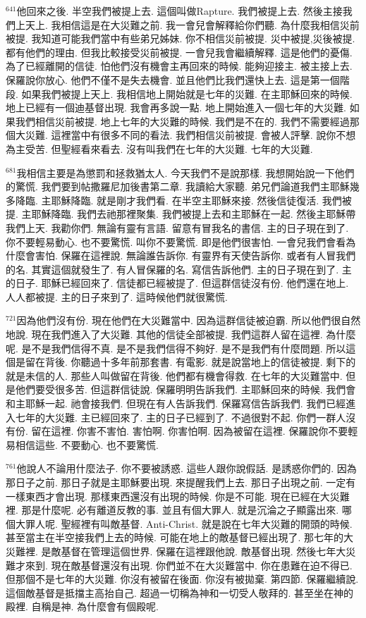 \documentclass{book}
\begin{document}
$^{641}$他回來之後.
半空我們被提上去.
這個叫做Rapture.
我們被提上去.
然後主接我們上天上.
我相信這是在大災難之前.
我一會兒會解釋給你們聽.
為什麼我相信災前被提.
我知道可能我們當中有些弟兄姊妹.
你不相信災前被提.
災中被提,災後被提.
都有他們的理由.
但我比較接受災前被提.
一會兒我會繼續解釋.
這是他們的憂傷.
為了已經離開的信徒.
怕他們沒有機會主再回來的時候.
能夠迎接主.
被主接上去.
保羅說你放心.
他們不僅不是失去機會.
並且他們比我們還快上去.
這是第一個階段.
如果我們被提上天上.
我相信地上開始就是七年的災難.
在主耶穌回來的時候.
地上已經有一個迪基督出現.
我會再多說一點.
地上開始進入一個七年的大災難.
如果我們相信災前被提.
地上七年的大災難的時候.
我們是不在的.
我們不需要經過那個大災難.
這裡當中有很多不同的看法.
我們相信災前被提.
會被人評擊.
說你不想為主受苦.
但聖經看來看去.
沒有叫我們在七年的大災難.
七年的大災難.

$^{681}$我相信主要是為懲罰和拯救猶太人.
今天我們不是說那樣.
我想開始說一下他們的驚慌.
我們要到帖撒羅尼加後書第二章.
我讀給大家聽.
弟兄們論道我們主耶穌幾多降臨.
主耶穌降臨.
就是剛才我們看.
在半空主耶穌來接.
然後信徒復活.
我們被提.
主耶穌降臨.
我們去祂那裡聚集.
我們被提上去和主耶穌在一起.
然後主耶穌帶我們上天.
我勸你們.
無論有靈有言語.
留意有冒我名的書信.
主的日子現在到了.
你不要輕易動心.
也不要驚慌.
叫你不要驚慌.
即是他們很害怕.
一會兒我們會看為什麼會害怕.
保羅在這裡說.
無論誰告訴你.
有靈界有天使告訴你.
或者有人冒我們的名.
其實這個就發生了.
有人冒保羅的名.
寫信告訴他們.
主的日子現在到了.
主的日子.
耶穌已經回來了.
信徒都已經被提了.
但這群信徒沒有份.
他們還在地上.
人人都被提.
主的日子來到了.
這時候他們就很驚慌.

$^{721}$因為他們沒有份.
現在他們在大災難當中.
因為這群信徒被迫霸.
所以他們很自然地說.
現在我們進入了大災難.
其他的信徒全部被提.
我們這群人留在這裡.
為什麼呢.
是不是我們信得不真.
是不是我們信得不夠好.
是不是我們有什麼問題.
所以這個是留在背後.
你聽過十多年前那套書.
有電影.
就是說當地上的信徒被提.
剩下的就是未信的人.
那些人叫做留在背後.
他們都有機會得救.
在七年的大災難當中.
但是他們要受很多苦.
但這群信徒說.
保羅明明告訴我們.
主耶穌回來的時候.
我們會和主耶穌一起.
祂會接我們.
但現在有人告訴我們.
保羅寫信告訴我們.
我們已經進入七年的大災難.
主已經回來了.
主的日子已經到了.
不過很對不起.
你們一群人沒有份.
留在這裡.
你害不害怕.
害怕啊.
你害怕啊.
因為被留在這裡.
保羅說你不要輕易相信這些.
不要動心.
也不要驚慌.

$^{761}$他說人不論用什麼法子.
你不要被誘惑.
這些人跟你說假話.
是誘惑你們的.
因為那日子之前.
那日子就是主耶穌要出現.
來提醒我們上去.
那日子出現之前.
一定有一樣東西才會出現.
那樣東西還沒有出現的時候.
你是不可能.
現在已經在大災難裡.
那是什麼呢.
必有離道反教的事.
並且有個大罪人.
就是沉淪之子顯露出來.
哪個大罪人呢.
聖經裡有叫敵基督.
Anti-Christ.
就是說在七年大災難的開頭的時候.
甚至當主在半空接我們上去的時候.
可能在地上的敵基督已經出現了.
那七年的大災難裡.
是敵基督在管理這個世界.
保羅在這裡跟他說.
敵基督出現.
然後七年大災難才來到.
現在敵基督還沒有出現.
你們並不在大災難當中.
你在患難在迫不得已.
但那個不是七年的大災難.
你沒有被留在後面.
你沒有被拋棄.
第四節.
保羅繼續說.
這個敵基督是抵擋主高抬自己.
超過一切稱為神和一切受人敬拜的.
甚至坐在神的殿裡.
自稱是神.
為什麼會有個殿呢.
\end{document}
